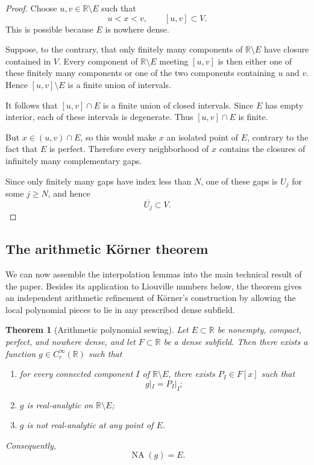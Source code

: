 \documentclass[11pt,reqno]{amsart}
\numberwithin{equation}{section}
\newtheorem{theorem}{Theorem}[section]
\theoremstyle{definition}
\theoremstyle{remark}
\newcommand{\R}{\mathbb R}
\newcommand{\NA}{\operatorname{NA}}
\begin{document}
\begin{proof}
Choose $u,v\in\R\setminus E$ such that
\[
u<x<v,
\qquad
[u,v]\subset V.
\]
This is possible because $E$ is nowhere dense.

Suppose, to the contrary, that only finitely many components of
$\R\setminus E$ have closure contained in $V$.  Every component of
$\R\setminus E$ meeting $[u,v]$ is then either one of these finitely
many components or one of the two components containing $u$ and $v$.
Hence $[u,v]\setminus E$ is a finite union of intervals.

It follows that $[u,v]\cap E$ is a finite union of closed intervals.
Since $E$ has empty interior, each of these intervals is degenerate.
Thus $[u,v]\cap E$ is finite.

But $x\in(u,v)\cap E$, so this would make $x$ an isolated point of $E$,
contrary to the fact that $E$ is perfect.  Therefore every neighborhood
of $x$ contains the closures of infinitely many complementary gaps.

Since only finitely many gaps have index less than $N$, one of these
gaps is $U_j$ for some $j\ge N$, and hence
\[
\overline{U_j}\subset V.
\]
\end{proof}

\subsection*{The arithmetic K\"orner theorem}

We can now assemble the interpolation lemmas into the main technical result of the paper. Besides its application to Liouville numbers below, the theorem gives an independent arithmetic refinement of K\"orner's construction by allowing the local polynomial pieces to lie in any prescribed dense subfield.

\begin{theorem}[Arithmetic polynomial sewing]\label{thm:sewing}
Let $E\subset\R$ be nonempty, compact, perfect, and nowhere dense, and let
$F\subset\R$ be a dense subfield. Then there exists a function
$g\in C_c^\infty(\R)$ such that
\begin{enumerate}[label=\textup{(\roman*)}]
\item for every connected component $I$ of $\R\setminus E$, there exists
$P_I\in F[x]$ such that
\[
g|_I=P_I|_I;
\]
\item $g$ is real-analytic on $\R\setminus E$;
\item $g$ is not real-analytic at any point of $E$.
\end{enumerate}
Consequently,
\[
\NA(g)=E.
\]
\end{theorem}
\end{document}

